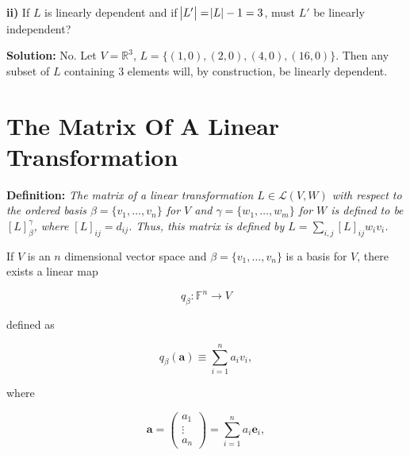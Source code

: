 \documentclass[12pt, a4paper]{article}
\begin{document}
 \vspace{4mm}\par
 
 \textbf{ii)} If $L$ is linearly dependent and if $\abs{L'}=\abs{L}-1=3$, must $L'$ be linearly independent?
 
 \vspace{4mm}
 
 \textbf{Solution:} No. Let $V=\mathbb{R}^3$, $L=\{(1,0),(2,0),(4,0), (16,0)\}$. Then any subset of $L$ containing $3$ elements will, by construction, be linearly dependent. 
 
 \section{The Matrix Of A Linear Transformation}
 \noindent\textbf{Definition:}\textit{ The matrix of a linear transformation $L\in\mathcal{L}(V,W)$ with respect to the ordered basis $\beta=\{v_1,\dots,v_n\}$ for $V$ and $\gamma=\{w_1,\dots,w_m\}$ for $W$ is defined to be $[L]_{\beta}^{\gamma}$, where $[L]_{ij}=d_{ij}$. Thus, this matrix is defined by $L=\sum_{i,j}[L]_{ij}w_iv_i$.}
 
 \vspace{2mm}
 
 If $V$ is an $n$ dimensional vector space and $\beta=\{v_1,\dots,v_n\}$ is a basis for $V$, there exists a linear map
 
 \begin{equation*}
     q_{\beta}\colon \mathbb{F}^n\rightarrow V
 \end{equation*}
 
 \vspace{2mm}
 
 \noindent defined as
 
 \begin{equation*}
     q_{\beta}(\mathbf{a})\equiv\sum\limits_{i=1}^na_iv_i,
 \end{equation*}
 
 \vspace{2mm}
 
 \noindent where
 
 \begin{equation*}
     \mathbf{a}=\begin{pmatrix} a_1 \\ \vdots \\ a_n \end{pmatrix} = \sum\limits_{i=1}^na_i\mathbf{e}_i,
 \end{equation*}
 
\end{document}
